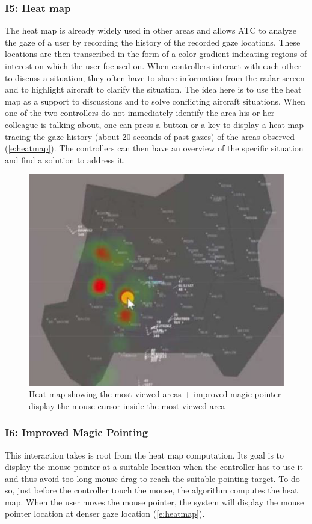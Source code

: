 \subsubsection{I5: Heat map}
The heat map is already widely used in other areas and
allows ATC to analyze the gaze of a user by recording the
history of the recorded gaze locations. These locations are
then transcribed in the form of a color gradient indicating
regions of interest on which the user focused on. When
controllers interact with each other to discuss a situation,
they often have to share information from the radar screen
and to highlight aircraft to clarify the situation. The idea
here is to use the heat map as a support to discussions and to
solve conflicting aircraft situations. When one of the
two controllers do not immediately identify the area his or
her colleague is talking about, one can press a button or a
key to display a heat map tracing the gaze history (about 20
seconds of past gazes) of the areas observed (\autoref{e:heatmap}). The
controllers can then have an overview of the specific
situation and find a solution to address it.

\begin{figure}
 \centering
	\includegraphics{Figures/heatmap.png}
	\caption{
	Heat map showing the most viewed areas +
improved magic pointer display the mouse cursor
inside the most viewed area}
	\label{e:heatmap}
\end{figure}

\subsubsection{I6: Improved Magic Pointing}
This interaction takes is root from the heat map
computation. Its goal is to display the mouse pointer at a
suitable location when the controller has to use it and thus
avoid too long mouse drag to reach the suitable pointing
target. To do so, just before the controller touch the mouse,
the algorithm computes the heat map. When the user moves
the mouse pointer, the system will display the mouse pointer
location at denser gaze location (\autoref{e:heatmap}).

